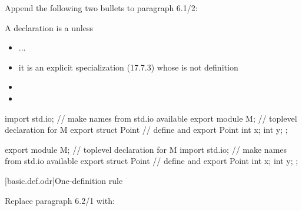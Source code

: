 \noindent
Append the following two bullets to paragraph 6.1/2:
\begin{std.txt}
  \resetalinea[1]
  \alinea
  A declaration is a  unless
  \begin{itemize}
    \item ...
    \item it is an explicit specialization (17.7.3) whose 
    is not definition\added{,}
    \color{addclr}
    \item {}
    \item {} 
  \end{itemize}
  \color{addclr}
\enterexample
\begin{before}\color{addclr}
\begin{codeblock}
    import std.io;                  // make names from std.io available
    export module M;                // toplevel declaration for M
    export struct Point {           // define and export Point
      int x;
      int y;
    };
\end{codeblock}
\end{before}\begin{after}\color{addclr}
\begin{codeblock}
    export module M;                // toplevel declaration for M
    import std.io;                  // make names from std.io available
    export struct Point {           // define and export Point
      int x;
      int y;
    };
\end{codeblock}
\end{after}
\exitexample
\end{std.txt}


[basic.def.odr]{One-definition rule}

Replace paragraph 6.2/1 with:
\begin{std.txt}\color{addclr}
  \resetalinea[0]
  \alinea
  \begin{before}
  \end{before}
  \begin{after}
  \end{after}
\end{std.txt}

